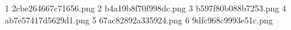 1 2cbe264667c71656.png
2 b4a19b8f70f998dc.png
3 b597f80b088b7253.png
4 ab7e57417d5629d1.png
5 67ac82892a335924.png
6 9dfc968c9993e51c.png
